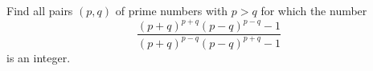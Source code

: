 Find all pairs $(p, q)$ of prime numbers with $p > q$ for which the number
\[
\frac{(p+q)^{p+q}(p-q)^{p-q} - 1}{(p+q)^{p-q}(p-q)^{p+q} - 1}
\]
is an integer.
